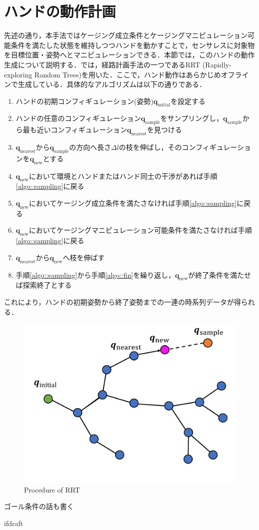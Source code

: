 \documentclass[a4paper,twoside,12pt,papersize, dvipdfmx]{iirthesis}
\begin{document}
\section{ハンドの動作計画\cite{komiyama2021}}\label{sec::sicm::planning}
先述の通り，本手法ではケージング成立条件とケージングマニピュレーション可能条件を満たした状態を維持しつつハンドを動かすことで，センサレスに対象物を目標位置・姿勢へとマニピュレーションできる．本節では，このハンドの動作生成について説明する．\cite{komiyama2021}では，経路計画手法の一つであるRRT (Rapidly-exploring Random Trees)\cite{lavalle2001}を用いた．ここで，ハンド動作はあらかじめオフラインで生成している．具体的なアルゴリズムは以下の通りである．
\begin{enumerate}
\item ハンドの初期コンフィギュレーション(姿勢)$\bm{q}_{\mathrm{initial}}$を設定する
\item ハンドの任意のコンフィギュレーション$\bm{q}_{\mathrm{sample}}$をサンプリングし，$\bm{q}_{\mathrm{sample}}$から最も近いコンフィギュレーション$\bm{q}_{\mathrm{nearest}}$を見つける\label{algo::sampling}
\item $\bm{q}_{\mathrm{nearest}}$から$\bm{q}_{\mathrm{sample}}$の方向へ長さ$\Delta l$の枝を伸ばし，そのコンフィギュレーションを$\bm{q}_{\mathrm{new}}$とする
\item $\bm{q}_{\mathrm{new}}$において環境とハンドまたはハンド同士の干渉があれば手順\ref{algo::sampling}に戻る
\item $\bm{q}_{\mathrm{new}}$においてケージング成立条件を満たさなければ手順\ref{algo::sampling}に戻る
\item $\bm{q}_{\mathrm{new}}$においてケージングマニピュレーション可能条件を満たさなければ手順\ref{algo::sampling}に戻る
\item $\bm{q}_{\mathrm{nearest}}$から$\bm{q}_{\mathrm{new}}$へ枝を伸ばす\label{algo::fin}
\item 手順\ref{algo::sampling}から手順\ref{algo::fin}を繰り返し，$\bm{q}_{\mathrm{new}}$が終了条件を満たせば探索終了とする
\end{enumerate}
これにより，ハンドの初期姿勢から終了姿勢までの一連の時系列データが得られる．
\begin{figure}[b]
\centering
\includegraphics[width=0.5\hsize]{fig/Sensorless_ICM/rrtdiagram.pdf}
\caption{Procedure of RRT\cite{komiyama2021}}
\label{fig::sicm::rrt}
\end{figure}

ゴール条件の話も書く

\expandafter\ifx\csname ifdraft\endcsname\relax
    
\end{document}

